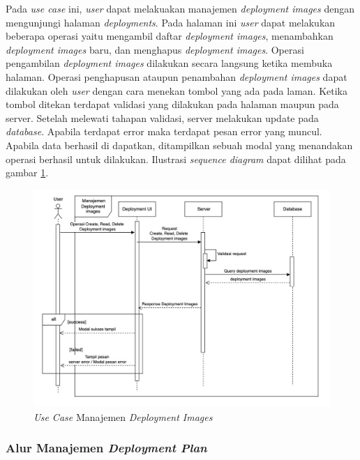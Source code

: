 Pada \textit{use case} ini, \textit{user} dapat melakuakan manajemen \textit{deployment images} dengan mengunjungi halaman \textit{deployments}. Pada halaman ini \textit{user} dapat melakukan beberapa operasi yaitu mengambil daftar \textit{deployment images}, menambahkan \textit{deployment images} baru, dan menghapus \textit{deployment images}. Operasi pengambilan \textit{deployment images} dilakukan secara langsung ketika membuka halaman. Operasi penghapusan ataupun penambahan \textit{deployment images} dapat dilakukan oleh \textit{user} dengan cara menekan tombol yang ada pada laman. Ketika tombol ditekan terdapat validasi yang dilakukan pada halaman maupun pada server. Setelah melewati tahapan validasi, server melakukan update pada \textit{database}. Apabila terdapat error maka terdapat pesan error yang muncul. Apabila data berhasil di dapatkan, ditampilkan sebuah modal yang menandakan operasi berhasil untuk dilakukan. Ilustrasi \textit{sequence diagram} dapat dilihat pada gambar \ref{fig:usecase-10}.

\begin{figure}[ht]
  \centering
  \includegraphics[width=1\textwidth]{resources/chapter-3/usecase/uc-10.jpg}
  \caption{\textit{Use Case} Manajemen \textit{Deployment Images}}
  \label{fig:usecase-10}
\end{figure}

\pagebreak

\subsubsection{Alur Manajemen \textit{Deployment Plan}}

